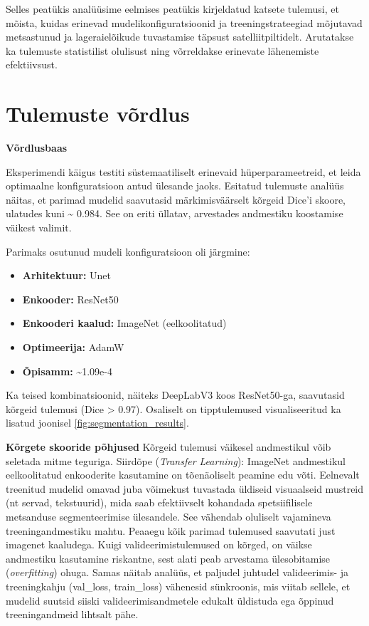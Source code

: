 Selles peatükis analüüsime eelmises peatükis kirjeldatud katsete tulemusi, et mõista, kuidas erinevad mudelikonfiguratsioonid ja treeningstrateegiad mõjutavad metsastunud ja lageraielõikude tuvastamise täpsust satelliitpiltidelt. Arutatakse ka tulemuste statistilist olulisust ning võrreldakse erinevate lähenemiste efektiivsust.
\section{Tulemuste võrdlus}
\textbf{Võrdlusbaas}

Eksperimendi käigus testiti süstemaatiliselt erinevaid hüperparameetreid, et leida optimaalne konfiguratsioon antud ülesande jaoks. 
Esitatud tulemuste analüüs näitas, et parimad mudelid
saavutasid märkimisväärselt kõrgeid Dice'i skoore, ulatudes kuni \textasciitilde
0.984. See on eriti üllatav, arvestades andmestiku koostamise väikest valimit.

Parimaks osutunud mudeli konfiguratsioon oli järgmine:
\begin{itemize}
  \item \textbf{Arhitektuur:} Unet
  \item \textbf{Enkooder:} ResNet50
  \item \textbf{Enkooderi kaalud:} ImageNet (eelkoolitatud)
  \item \textbf{Optimeerija:} AdamW
  \item \textbf{Õpisamm:} \textasciitilde 1.09e-4
\end{itemize}

Ka teised kombinatsioonid,
näiteks DeepLabV3 koos ResNet50-ga, saavutasid kõrgeid tulemusi (Dice > 0.97).
Osaliselt on tipptulemused visualiseeritud ka lisatud joonisel \ref{fig:segmentation_results}.

\textbf{Kõrgete skooride põhjused}
Kõrgeid tulemusi väikesel andmestikul võib seletada mitme teguriga.
Siirdõpe (\textit{Transfer Learning}): ImageNet andmestikul eelkoolitatud enkooderite
kasutamine on tõenäoliselt peamine edu võti. Eelnevalt treenitud mudelid omavad
juba võimekust tuvastada üldiseid visuaalseid mustreid (nt servad, tekstuurid),
mida saab efektiivselt kohandada spetsiifilisele metsanduse segmenteerimise
ülesandele. See vähendab oluliselt vajamineva treeningandmestiku mahtu. Peaaegu
kõik parimad tulemused saavutati just imagenet kaaludega. 
Kuigi valideerimistulemused on kõrged, on väikse andmestiku kasutamine riskantne, sest alati peab arvestama ülesobitamise (\textit{overfitting}) ohuga. Samas näitab analüüs, et paljudel juhtudel valideerimis- ja treeningkahju
(val\_loss, train\_loss) vähenesid sünkroonis, mis viitab sellele, et mudelid
suutsid siiski valideerimisandmetele edukalt üldistuda ega õppinud
treeningandmeid lihtsalt pähe.

